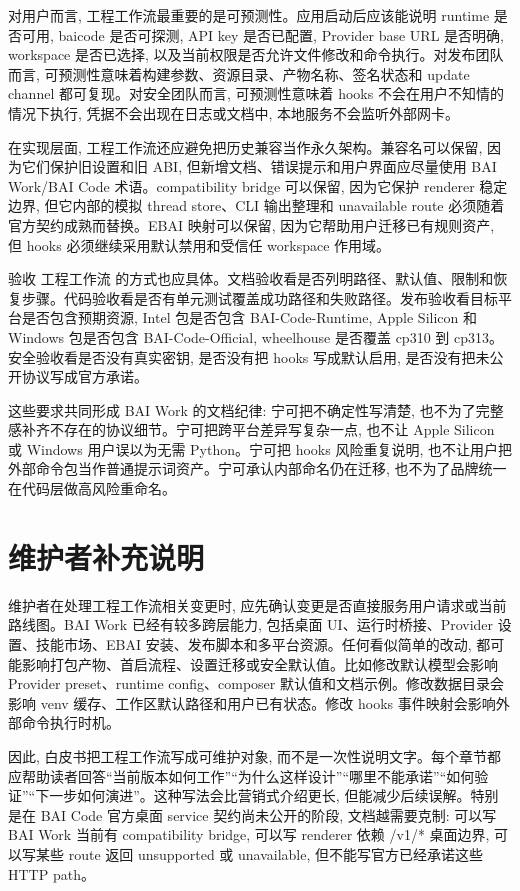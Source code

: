 对用户而言, 工程工作流最重要的是可预测性。应用启动后应该能说明 runtime 是否可用, baicode 是否可探测, API key 是否已配置, Provider base URL 是否明确, workspace 是否已选择, 以及当前权限是否允许文件修改和命令执行。对发布团队而言, 可预测性意味着构建参数、资源目录、产物名称、签名状态和 update channel 都可复现。对安全团队而言, 可预测性意味着 hooks 不会在用户不知情的情况下执行, 凭据不会出现在日志或文档中, 本地服务不会监听外部网卡。

在实现层面, 工程工作流还应避免把历史兼容当作永久架构。兼容名可以保留, 因为它们保护旧设置和旧 ABI, 但新增文档、错误提示和用户界面应尽量使用 BAI Work/BAI Code 术语。compatibility bridge 可以保留, 因为它保护 renderer 稳定边界, 但它内部的模拟 thread store、CLI 输出整理和 unavailable route 必须随着官方契约成熟而替换。EBAI 映射可以保留, 因为它帮助用户迁移已有规则资产, 但 hooks 必须继续采用默认禁用和受信任 workspace 作用域。

验收 工程工作流 的方式也应具体。文档验收看是否列明路径、默认值、限制和恢复步骤。代码验收看是否有单元测试覆盖成功路径和失败路径。发布验收看目标平台是否包含预期资源, Intel 包是否包含 BAI-Code-Runtime, Apple Silicon 和 Windows 包是否包含 BAI-Code-Official, wheelhouse 是否覆盖 cp310 到 cp313。安全验收看是否没有真实密钥, 是否没有把 hooks 写成默认启用, 是否没有把未公开协议写成官方承诺。

这些要求共同形成 BAI Work 的文档纪律: 宁可把不确定性写清楚, 也不为了完整感补齐不存在的协议细节。宁可把跨平台差异写复杂一点, 也不让 Apple Silicon 或 Windows 用户误以为无需 Python。宁可把 hooks 风险重复说明, 也不让用户把外部命令包当作普通提示词资产。宁可承认内部命名仍在迁移, 也不为了品牌统一在代码层做高风险重命名。

\section{维护者补充说明}

维护者在处理工程工作流相关变更时, 应先确认变更是否直接服务用户请求或当前路线图。BAI Work 已经有较多跨层能力, 包括桌面 UI、运行时桥接、Provider 设置、技能市场、EBAI 安装、发布脚本和多平台资源。任何看似简单的改动, 都可能影响打包产物、首启流程、设置迁移或安全默认值。比如修改默认模型会影响 Provider preset、runtime config、composer 默认值和文档示例。修改数据目录会影响 venv 缓存、工作区默认路径和用户已有状态。修改 hooks 事件映射会影响外部命令执行时机。

因此, 白皮书把工程工作流写成可维护对象, 而不是一次性说明文字。每个章节都应帮助读者回答“当前版本如何工作”“为什么这样设计”“哪里不能承诺”“如何验证”“下一步如何演进”。这种写法会比营销式介绍更长, 但能减少后续误解。特别是在 BAI Code 官方桌面 service 契约尚未公开的阶段, 文档越需要克制: 可以写 BAI Work 当前有 compatibility bridge, 可以写 renderer 依赖 /v1/* 桌面边界, 可以写某些 route 返回 unsupported 或 unavailable, 但不能写官方已经承诺这些 HTTP path。

